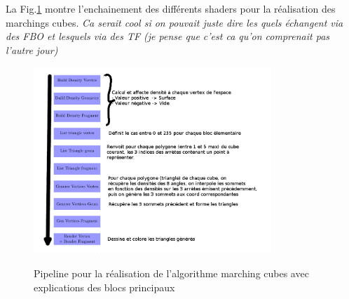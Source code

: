 \documentclass[a4paper]{article}
\begin{document}
La Fig.\ref{pipeline} montre l'enchainement des différents shaders pour la réalisation des marchings cubes. \textit{Ca serait cool si on pouvait juste dire les quels échangent via des FBO et lesquels via des TF (je pense que c'est ca qu'on comprenait pas l'autre jour)}

\begin{figure}[H]
\centering
\includegraphics[width=0.8\textwidth]{figures/pipeline3.png}
\label{pipeline}
\caption{Pipeline pour la réalisation de l'algorithme marching cubes avec explications des blocs principaux}
\end{figure}
%
%
%
%
%
%
%
%
%
%
%
%
%
%
%
%
%
\end{document}
